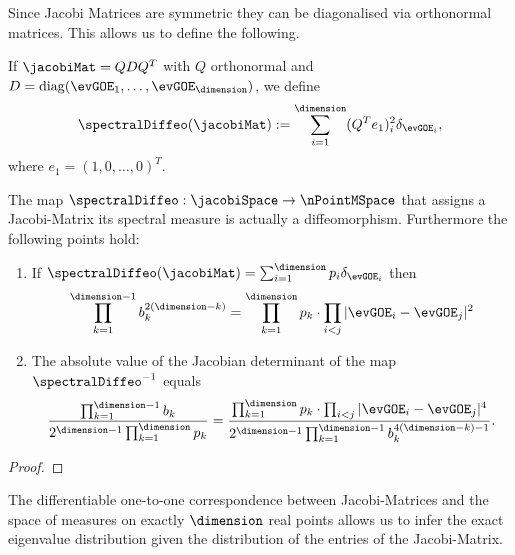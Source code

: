 Since Jacobi Matrices are symmetric they can be diagonalised via orthonormal matrices. This allows us to define the following.

\begin{definition}
    If $\jacobiMat = QDQ^T$ with $Q$ orthonormal and $D = \operatorname{diag}(\evGOE_1, \ldots, \evGOE_\dimension)$, we define
    \begin{align*}
        \spectralDiffeo(\jacobiMat) := \sum_{i=1}^{\dimension} (Q^T e_1)^2_i \delta_{\evGOE_i},
    \end{align*}
    where $e_1 = (1,0,\ldots,0)^T$.
\end{definition}

\begin{theorem}\label{thm: trafoTheorem}
    The map $\spectralDiffeo: \jacobiSpace \to \nPointMSpace$ that assigns a Jacobi-Matrix its spectral measure is actually a diffeomorphism. Furthermore the following points hold:
    \begin{enumerate}[label=(\alph*)]
        \item If $\spectralDiffeo(\jacobiMat) = \sum_{i=1}^\dimension p_i \delta_{\evGOE_i}$ then
        \begin{align}
            \prod_{k=1}^{\dimension-1} b_k^{2(\dimension-k)} = \prod_{k=1}^\dimension p_k \cdot \prod_{i<j} |\evGOE_i - \evGOE_j|^2
        \end{align}
        \item The absolute value of the Jacobian determinant of the map $\spectralDiffeo^{-1}$ equals
        \begin{align}\label{inverseSpectralDet}
            \frac{\prod_{k=1}^{\dimension-1} b_k}{2^{\dimension-1} \prod_{k=1}^\dimension p_k} 
            = \frac{\prod_{k=1}^\dimension p_k \cdot \prod_{i<j} |\evGOE_i - \evGOE_j|^4}{2^{\dimension-1} \prod_{k=1}^{\dimension-1} b_k^{4(\dimension - k)-1}}.
        \end{align}
    \end{enumerate}
\end{theorem}
\begin{proof}
\end{proof}

The differentiable one-to-one correspondence between Jacobi-Matrices and the space of measures on exactly $\dimension$ real points allows us to infer the exact eigenvalue distribution given the distribution of the entries of the Jacobi-Matrix.

